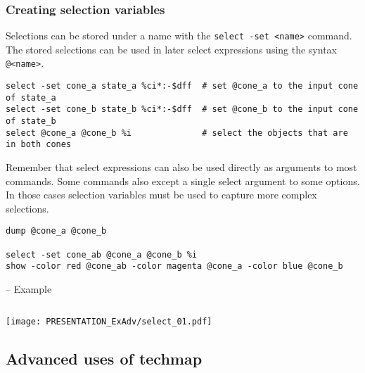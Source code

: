 \subsubsection{Creating selection variables}

\begin{frame}[fragile]{\subsubsecname}
Selections can be stored under a name with the {\tt select -set <name>}
command. The stored selections can be used in later select expressions
using the syntax {\tt @<name>}.

\medskip
\begin{lstlisting}[xleftmargin=0.5cm, basicstyle=\ttfamily\fontsize{8pt}{10pt}\selectfont, language=ys]
select -set cone_a state_a %ci*:-$dff  # set @cone_a to the input cone of state_a
select -set cone_b state_b %ci*:-$dff  # set @cone_b to the input cone of state_b
select @cone_a @cone_b %i              # select the objects that are in both cones
\end{lstlisting}

\bigskip
Remember that select expressions can also be used directly as arguments to most
commands. Some commands also except a single select argument to some options.
In those cases selection variables must be used to capture more complex selections.

\medskip
\begin{lstlisting}[xleftmargin=0.5cm, basicstyle=\ttfamily\fontsize{8pt}{10pt}\selectfont, language=ys]
dump @cone_a @cone_b

select -set cone_ab @cone_a @cone_b %i
show -color red @cone_ab -color magenta @cone_a -color blue @cone_b
\end{lstlisting}
\end{frame}

\begin{frame}[fragile]{\subsubsecname{} -- Example}
\begin{columns}
\column[t]{4cm}

\column[t]{7cm}

\end{columns}
\hfil\texttt{[image: PRESENTATION\_ExAdv/select\_01.pdf]}
\end{frame}


\subsection{Advanced uses of techmap}

